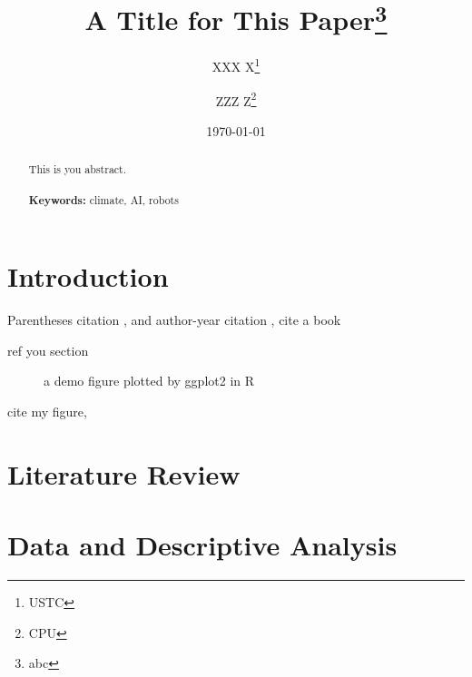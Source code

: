 \documentclass[a4paper, 12pt]{article}
\begin{document}
\begin{titlepage}
    \title{A Title for This Paper\thanks{abc}}
    \author{XXX X\thanks{USTC} \and ZZZ  Z\thanks{CPU}}
    \date{\today}
    \maketitle
    \begin{abstract}
        \noindent
        This is you abstract.
        \\
        \vspace{0in}\\
        \noindent\textbf{Keywords:} climate, AI, robots\\
        \bigskip
    \end{abstract}
    \setcounter{page}{0}
    \thispagestyle{empty}
\end{titlepage}
\pagebreak \newpage
\doublespacing

\section{Introduction}\label{sec:intro}
Parentheses citation \citep{DunningHuchetteLubin2017,DunningHuchetteLubin2017}, and author-year citation \citet{DunningHuchetteLubin2017}, cite a book \citep[\S 2.1.1]{DunningHuchetteLubin2017}

ref you section 
\begin{figure}[!htbp]
    \centering
    
    \caption{a demo figure plotted by ggplot2 in R}
    \label{fig:demo}
\end{figure}
cite my figure, 

\begin{figure}[!htbp]
    \centering
    
\end{figure}


\section{Literature Review}
\section{Data and Descriptive Analysis}
\end{document}
